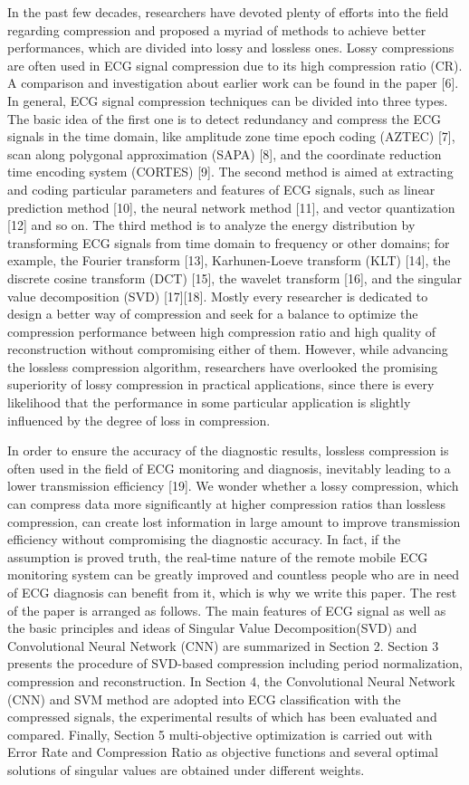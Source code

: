 \documentclass[journal]{IEEEtran}
\begin{document}
In the past few decades, researchers have devoted plenty of efforts into the field regarding compression and proposed a myriad of methods to achieve better performances, which are divided into lossy and lossless ones. Lossy compressions are often used in ECG signal compression due to its high compression ratio (CR). A comparison and investigation about earlier work can be found in the paper [6]. In general, ECG signal compression techniques can be divided into three types. The basic idea of the first one is to detect redundancy and compress the ECG signals in the time domain, like amplitude zone time epoch coding (AZTEC) [7], scan along polygonal approximation (SAPA) [8], and the coordinate reduction time encoding system (CORTES) [9]. The second method is aimed at extracting and coding particular parameters and features of ECG signals, such as linear prediction method [10], the neural network method [11], and vector quantization [12] and so on. The third method is to analyze the energy distribution by transforming ECG signals from time domain to frequency or other domains; for example, the Fourier transform [13], Karhunen-Loeve transform (KLT) [14], the discrete cosine transform (DCT) [15], the wavelet transform [16], and the singular value decomposition (SVD) [17][18]. Mostly every researcher is dedicated to design a better way of compression and seek for a balance to optimize the compression performance between high compression ratio and high quality of reconstruction without compromising either of them. However, while advancing the lossless compression algorithm, researchers have overlooked the promising superiority of lossy compression in practical applications, since there is every likelihood that the performance in some particular application is slightly influenced by the degree of loss in compression.

In order to ensure the accuracy of the diagnostic results, lossless compression is often used in the field of ECG monitoring and diagnosis, inevitably leading to a lower transmission efficiency [19]. We wonder whether a lossy compression, which can compress data more significantly at higher compression ratios than lossless compression, can create lost information in large amount to improve transmission efficiency without compromising the diagnostic accuracy. In fact, if the assumption is proved truth, the real-time nature of the remote mobile ECG monitoring system can be greatly improved and countless people who are in need of ECG diagnosis can benefit from it, which is why we write this paper. The rest of the paper is arranged as follows. The main features of ECG signal as well as the basic principles and ideas of Singular Value Decomposition(SVD) and Convolutional Neural Network (CNN) are summarized in Section 2. Section 3 presents the procedure of SVD-based compression including period normalization, compression and reconstruction. In Section 4, the Convolutional Neural Network (CNN) and SVM method are adopted into ECG classification with the compressed signals, the experimental results of which has been evaluated and compared. Finally, Section 5 multi-objective optimization is carried out with Error Rate and Compression Ratio as objective functions and several optimal solutions of singular values are obtained under different weights.
\end{document}
